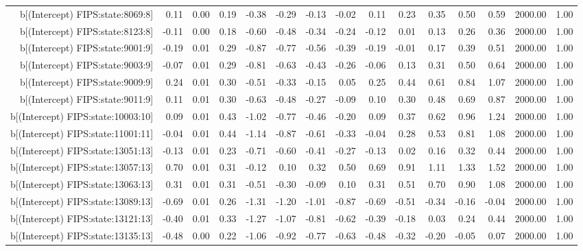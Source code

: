 \begin{table}[ht]
\begin{tabular}{rrrrrrrrrrrrrrr}
  b[(Intercept) FIPS:state:8069:8] & 0.11 & 0.00 & 0.19 & -0.38 & -0.29 & -0.13 & -0.02 & 0.11 & 0.23 & 0.35 & 0.50 & 0.59 & 2000.00 & 1.00 \\ 
  b[(Intercept) FIPS:state:8123:8] & -0.11 & 0.00 & 0.18 & -0.60 & -0.48 & -0.34 & -0.24 & -0.12 & 0.01 & 0.13 & 0.26 & 0.36 & 2000.00 & 1.00 \\ 
  b[(Intercept) FIPS:state:9001:9] & -0.19 & 0.01 & 0.29 & -0.87 & -0.77 & -0.56 & -0.39 & -0.19 & -0.01 & 0.17 & 0.39 & 0.51 & 2000.00 & 1.00 \\ 
  b[(Intercept) FIPS:state:9003:9] & -0.07 & 0.01 & 0.29 & -0.81 & -0.63 & -0.43 & -0.26 & -0.06 & 0.13 & 0.31 & 0.50 & 0.64 & 2000.00 & 1.00 \\ 
  b[(Intercept) FIPS:state:9009:9] & 0.24 & 0.01 & 0.30 & -0.51 & -0.33 & -0.15 & 0.05 & 0.25 & 0.44 & 0.61 & 0.84 & 1.07 & 2000.00 & 1.00 \\ 
  b[(Intercept) FIPS:state:9011:9] & 0.11 & 0.01 & 0.30 & -0.63 & -0.48 & -0.27 & -0.09 & 0.10 & 0.30 & 0.48 & 0.69 & 0.87 & 2000.00 & 1.00 \\ 
  b[(Intercept) FIPS:state:10003:10] & 0.09 & 0.01 & 0.43 & -1.02 & -0.77 & -0.46 & -0.20 & 0.09 & 0.37 & 0.62 & 0.96 & 1.24 & 2000.00 & 1.00 \\ 
  b[(Intercept) FIPS:state:11001:11] & -0.04 & 0.01 & 0.44 & -1.14 & -0.87 & -0.61 & -0.33 & -0.04 & 0.28 & 0.53 & 0.81 & 1.08 & 2000.00 & 1.00 \\ 
  b[(Intercept) FIPS:state:13051:13] & -0.13 & 0.01 & 0.23 & -0.71 & -0.60 & -0.41 & -0.27 & -0.13 & 0.02 & 0.16 & 0.32 & 0.44 & 2000.00 & 1.00 \\ 
  b[(Intercept) FIPS:state:13057:13] & 0.70 & 0.01 & 0.31 & -0.12 & 0.10 & 0.32 & 0.50 & 0.69 & 0.91 & 1.11 & 1.33 & 1.52 & 2000.00 & 1.00 \\ 
  b[(Intercept) FIPS:state:13063:13] & 0.31 & 0.01 & 0.31 & -0.51 & -0.30 & -0.09 & 0.10 & 0.31 & 0.51 & 0.70 & 0.90 & 1.08 & 2000.00 & 1.00 \\ 
  b[(Intercept) FIPS:state:13089:13] & -0.69 & 0.01 & 0.26 & -1.31 & -1.20 & -1.01 & -0.87 & -0.69 & -0.51 & -0.34 & -0.16 & -0.04 & 2000.00 & 1.00 \\ 
  b[(Intercept) FIPS:state:13121:13] & -0.40 & 0.01 & 0.33 & -1.27 & -1.07 & -0.81 & -0.62 & -0.39 & -0.18 & 0.03 & 0.24 & 0.44 & 2000.00 & 1.00 \\ 
  b[(Intercept) FIPS:state:13135:13] & -0.48 & 0.00 & 0.22 & -1.06 & -0.92 & -0.77 & -0.63 & -0.48 & -0.32 & -0.20 & -0.05 & 0.07 & 2000.00 & 1.00 \\ 

\end{tabular}
\end{table}
